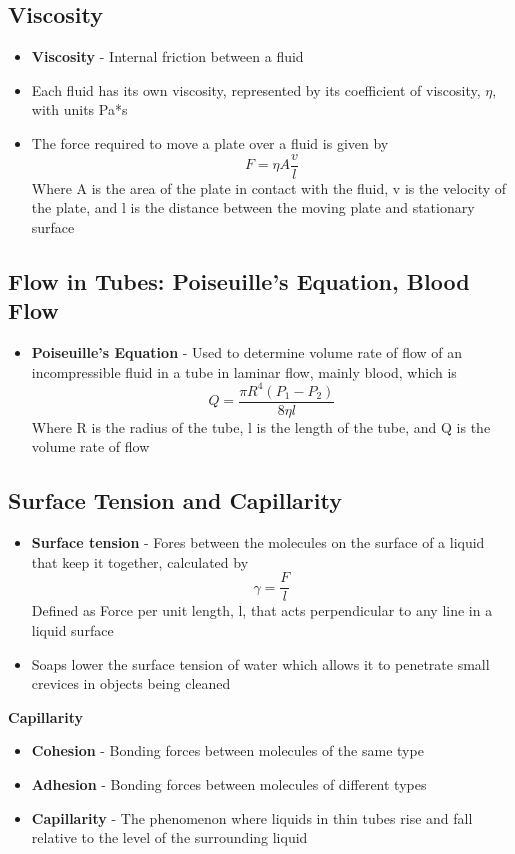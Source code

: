 \subsection{Viscosity}
\begin{itemize}
    \item \textbf{Viscosity} - Internal friction between a fluid
    \item Each fluid has its own viscosity, represented by its coefficient of viscosity, \(\eta\), with units Pa*s
    \item The force required to move a plate over a fluid is given by \[F=\eta A\frac{v}{l}\] Where A is the area of the plate in contact with the fluid, v is the velocity of the plate, and l is the distance between the moving plate and stationary surface
\end{itemize}

\subsection{Flow in Tubes: Poiseuille's Equation, Blood Flow}
\begin{itemize}
    \item \textbf{Poiseuille's Equation} - Used to determine volume rate of flow of an incompressible fluid in a tube in laminar flow, mainly blood, which is \[Q=\frac{\pi R^4(P_1-P_2)}{8\eta l}\] Where R is the radius of the tube, l is the length of the tube, and Q is the volume rate of flow
\end{itemize}

\subsection{Surface Tension and Capillarity}
\begin{itemize}
    \item \textbf{Surface tension} - Fores between the molecules on the surface of a liquid that keep it together, calculated by \[\gamma=\frac{F}{l}\] Defined as Force per unit length, l, that acts perpendicular to any line in a liquid surface
    \item Soaps lower the surface tension of water which allows it to penetrate small crevices in objects being cleaned
\end{itemize}

\textbf{Capillarity}
\begin{itemize}
    \item \textbf{Cohesion} - Bonding forces between molecules of the same type
    \item\textbf{Adhesion} - Bonding forces between molecules of different types
    \item\textbf{Capillarity} - The phenomenon where liquids in thin tubes rise and fall relative to the level of the surrounding liquid
\end{itemize}

